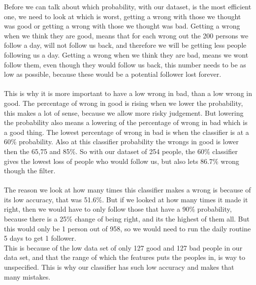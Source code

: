 Before we can talk about which probability, with our dataset, is the most efficient one, we need to look at which is worst, getting a wrong with those we thought was good or getting a wrong with those we thought was bad. Getting a wrong when we think they are good, means that for each wrong out the 200 persons we follow a day, will not follow us back, and therefore we will be getting less people following us a day. Getting a wrong when we think they are bad, means we wont follow them, even though they would follow us back, this number needs to be as low as possible, because these would be a potential follower lost forever.\\
\\
This is why it is more important to have a low wrong in bad, than a low wrong in good. The percentage of wrong in good is rising when we lower the probability, this makes a lot of sense, because we allow more risky judgement. But lowering the probability also means a lowering of the percentage of wrong in bad which is a good thing. The lowest percentage of wrong in bad is when the classifier is at a 60\% probability. Also at this classifier probability the wrongs in good is lower then the  65,75 and 85\%. So with our dataset of 254 people, the 60\% classifier gives the lowest loss of people who would follow us, but also lets 86.7\% wrong though the filter.\\
\\
The reason we look at how many times this classifier makes a wrong is because of its low accuracy, that was 51.6\%. But if we looked at how many times it made it right, then we would have to only follow those that have a 90\% probability, because there is a 25\% change of being right, and its the highest of them all. But this would only be 1 person out of 958, so we would need to run the daily routine 5 days to get 1 follower.\\
This is because of the low data set of only 127 good and 127 bad people in our data set, and that the range of which the features puts the peoples in, is way to unspecified. This is why our classifier has such low accuracy and makes that many mistakes.